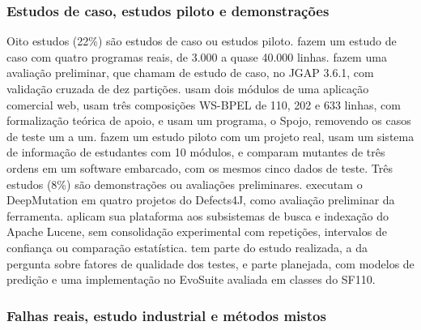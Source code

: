 \subsubsection{Estudos de caso, estudos piloto e demonstrações}
\label{subsubsec:estudos-caso-piloto}

Oito estudos (22\%) são estudos de caso ou estudos piloto.  fazem um estudo de caso com quatro programas reais, de 3.000 a quase 40.000 linhas.  fazem uma avaliação preliminar, que chamam de estudo de caso, no JGAP 3.6.1, com validação cruzada de dez partições.  usam dois módulos de uma aplicação comercial web,  usam três composições WS-BPEL de 110, 202 e 633 linhas, com formalização teórica de apoio, e  usam um programa, o Spojo, removendo os casos de teste um a um.  fazem um estudo piloto com um projeto real,  usam um sistema de informação de estudantes com 10 módulos, e  comparam mutantes de três ordens em um software embarcado, com os mesmos cinco dados de teste. Três estudos (8\%) são demonstrações ou avaliações preliminares.  executam o DeepMutation em quatro projetos do Defects4J, como avaliação preliminar da ferramenta.  aplicam sua plataforma aos subsistemas de busca e indexação do Apache Lucene, sem consolidação experimental com repetições, intervalos de confiança ou comparação estatística.  tem parte do estudo realizada, a da pergunta sobre fatores de qualidade dos testes, e parte planejada, com modelos de predição e uma implementação no EvoSuite avaliada em classes do SF110.

\subsubsection{Falhas reais, estudo industrial e métodos mistos}
\label{subsubsec:falhas-reais-industrial}

